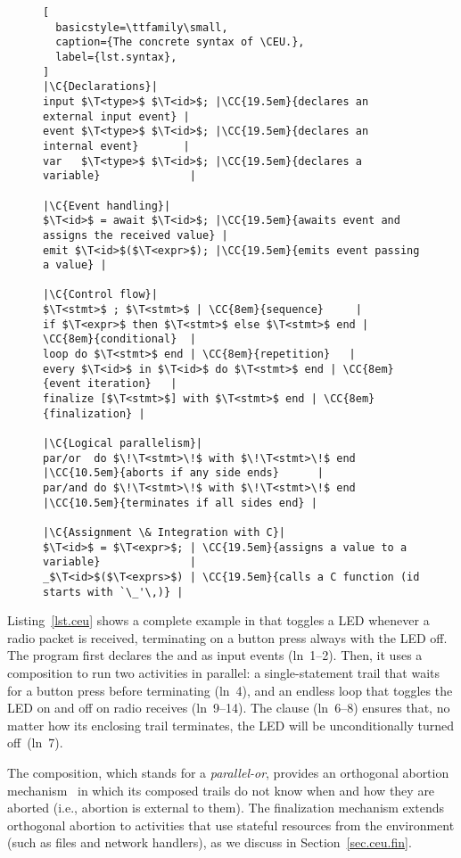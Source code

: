 \def\C#1{\rmfamily\itshape//~#1}
\def\CC#1#2{\hfill\makebox[#1][l]{\C{#2}}}
\def\T<#1>{\langle\mathit{#1}\rangle}
\bgroup
\begin{figure}
\begin{lstlisting}[
  basicstyle=\ttfamily\small,
  caption={The concrete syntax of \CEU.},
  label={lst.syntax},
]
|\C{Declarations}|
input $\T<type>$ $\T<id>$; |\CC{19.5em}{declares an external input event} |
event $\T<type>$ $\T<id>$; |\CC{19.5em}{declares an internal event}       |
var   $\T<type>$ $\T<id>$; |\CC{19.5em}{declares a variable}              |

|\C{Event handling}|
$\T<id>$ = await $\T<id>$; |\CC{19.5em}{awaits event and assigns the received value} |
emit $\T<id>$($\T<expr>$); |\CC{19.5em}{emits event passing a value} |

|\C{Control flow}|
$\T<stmt>$ ; $\T<stmt>$ | \CC{8em}{sequence}     |
if $\T<expr>$ then $\T<stmt>$ else $\T<stmt>$ end | \CC{8em}{conditional}  |
loop do $\T<stmt>$ end | \CC{8em}{repetition}   |
every $\T<id>$ in $\T<id>$ do $\T<stmt>$ end | \CC{8em}{event iteration}   |
finalize [$\T<stmt>$] with $\T<stmt>$ end | \CC{8em}{finalization} |

|\C{Logical parallelism}|
par/or  do $\!\T<stmt>\!$ with $\!\T<stmt>\!$ end |\CC{10.5em}{aborts if any side ends}      |
par/and do $\!\T<stmt>\!$ with $\!\T<stmt>\!$ end |\CC{10.5em}{terminates if all sides end} |

|\C{Assignment \& Integration with C}|
$\T<id>$ = $\T<expr>$; | \CC{19.5em}{assigns a value to a variable}              |
_$\T<id>$($\T<exprs>$) | \CC{19.5em}{calls a C function (id starts with `\_'\,)} |
\end{lstlisting}
\end{figure}
\egroup

Listing~\ref{lst.ceu} shows a complete example in \CEU that toggles a LED
whenever a radio packet is received, terminating on a button press always
with the LED off.
%
The program first declares the  and  as
input events (ln~1--2).
Then, it uses a  composition to run two activities in parallel:
a single-statement trail that waits for a button press before terminating
(ln~4), and an endless loop that toggles the LED on and off on radio receives
(ln~9--14).
The  clause (ln~6--8) ensures that, no matter how its enclosing
trail terminates, the LED will be unconditionally turned off~(ln~7).

The  composition, which stands for a \emph{parallel-or}, provides
an orthogonal abortion mechanism~\cite{esterel.preemption} in which its
composed trails do not know when and how they are aborted (i.e., abortion is
external to them).
%
%
The finalization mechanism extends orthogonal abortion to %
activities that use stateful resources from the environment (such as files and
network handlers), as we discuss in Section~\ref{sec.ceu.fin}.
%

